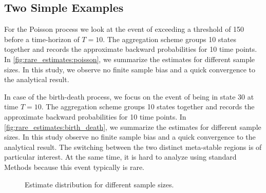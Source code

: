 \subsection{Two Simple Examples}
For the Poisson process we look at the event of exceeding a threshold of \num{150} before a time-horizon of $T=10$.
The aggregation scheme groups \num{10} states together and records the approximate backward probabilities for \num{10} time points.
In \autoref{fig:rare_estimates:poisson}, we summarize the estimates for different sample sizes.
In this study, we observe no finite sample bias and a quick convergence to the analytical result.

In case of the birth-death process, we focus on the event of being in state \num{30} at time $T=10$.
The aggregation scheme groups \num{10} states together and records the approximate backward probabilities for \num{10} time points.
In \autoref{fig:rare_estimates:birth_death}, we summarize the estimates for different sample sizes.
In this study observe no finite sample bias and a quick convergence to the analytical result.
The switching between the two distinct meta-stable regions is of particular interest.
At the same time, it is hard to analyze using standard Methods because this event typically is rare.
\begin{figure}[htb]
    \centering
    \caption[Estimates for different sample sizes]{\label{fig:rare_estimates}Estimate distribution for different sample sizes.}
\end{figure}
